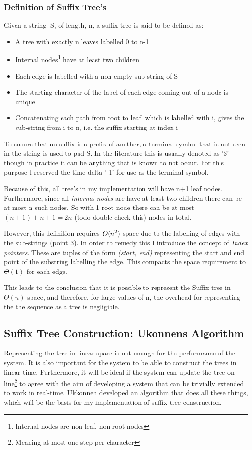 \documentclass[12pt,twoside,notitlepage]{report}
\begin{document}
			\subsubsection{Definition of Suffix Tree's}
			Given a string, S, of length, n, a suffix tree is said to be defined as:
			\begin{itemize}
				\item{A tree with exactly n leaves labelled 0 to n-1}
				\item{Internal nodes\footnote{Internal nodes are non-leaf, non-root nodes} have at least two children}
				\item{Each edge is labelled with a non empty sub-string of S}
				\item{The starting character of the label of each edge coming out of a node is unique}
				\item{Concatenating each path from root to leaf, which is labelled with i, gives the sub-string from i to n, i.e. the suffix starting at index i}
\end{itemize}
			
			To ensure that no suffix is a prefix of another, a terminal symbol that is not seen in the string is used to pad S. In the literature this is usually denoted as '\$' though in practice it can be anything that is known to not occur. For this purpose I reserved the time delta '-1' for use as the terminal symbol.

			Because of this, all tree's in my implementation will have n+1 leaf nodes. Furthermore, since all \emph{internal nodes} are have at least two children there can be at most n such nodes. So with 1 root node there can be at most $(n+1)+n+1 = 2n$ (todo double check this) nodes in total.
			
			However, this definition requires $O(n\textsuperscript{2})$ space due to the labelling of edges with the sub-strings (point 3). In order to remedy this I introduce the concept of \emph{Index pointers}. These are tuples of the form \emph{(start, end)} representing the start and end point of the substring labelling the edge. This compacts the space requirement to $\Theta(1)$ for each edge.
			
			This leads to the conclusion that it is possible to represent the Suffix tree in $\Theta(n)$ space, and therefore, for large values of n, the overhead for representing the the sequence as a tree is negligible.
			
			\subsection{\label{subsubsec:Ukonnens}Suffix Tree Construction: Ukonnens Algorithm}
			Representing the tree in linear space is not enough for the performance of the system. It is also important for the system to be able to construct the trees in linear time. Furthermore, it will be ideal if the system can update the tree on-line\footnote{Meaning at most one step per character} to agree with the aim of developing a system that can be trivially extended to work in real-time. Ukkonnen\cite{Ukkonen1995} developed an algorithm that does all these things, which will be the basis for my implementation of suffix tree construction.
			
\end{document}
